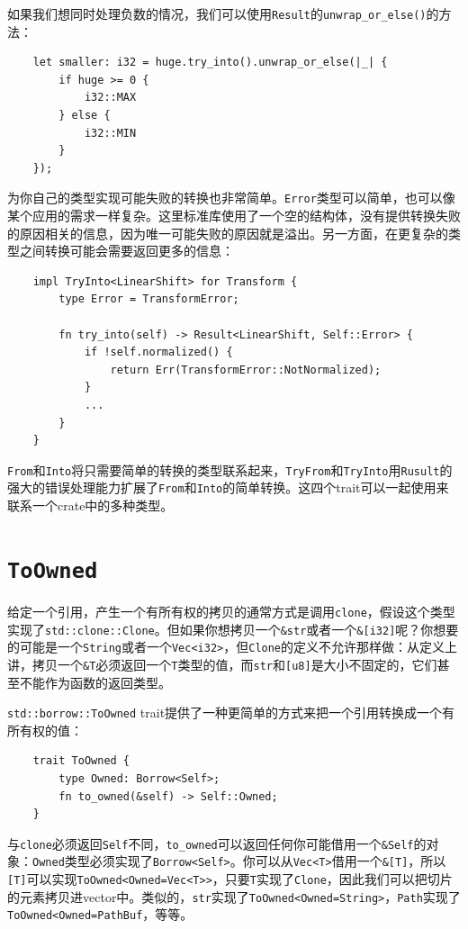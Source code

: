如果我们想同时处理负数的情况，我们可以使用\texttt{Result}的\texttt{unwrap\_or\_else()}的方法：
\begin{verbatim}
    let smaller: i32 = huge.try_into().unwrap_or_else(|_| {
        if huge >= 0 {
            i32::MAX
        } else {
            i32::MIN
        }
    });
\end{verbatim}

为你自己的类型实现可能失败的转换也非常简单。\texttt{Error}类型可以简单，也可以像某个应用的需求一样复杂。这里标准库使用了一个空的结构体，没有提供转换失败的原因相关的信息，因为唯一可能失败的原因就是溢出。另一方面，在更复杂的类型之间转换可能会需要返回更多的信息：
\begin{verbatim}
    impl TryInto<LinearShift> for Transform {
        type Error = TransformError;

        fn try_into(self) -> Result<LinearShift, Self::Error> {
            if !self.normalized() {
                return Err(TransformError::NotNormalized);
            }
            ...
        }
    }
\end{verbatim}

\texttt{From}和\texttt{Into}将只需要简单的转换的类型联系起来，\texttt{TryFrom}和\texttt{TryInto}用\texttt{Rusult}的强大的错误处理能力扩展了\texttt{From}和\texttt{Into}的简单转换。这四个trait可以一起使用来联系一个crate中的多种类型。

\section{\texttt{ToOwned}}\label{toowned}

给定一个引用，产生一个有所有权的拷贝的通常方式是调用\texttt{clone}，假设这个类型实现了\texttt{std::clone::Clone}。但如果你想拷贝一个\texttt{\&str}或者一个\texttt{\&[i32]}呢？你想要的可能是一个\texttt{String}或者一个\texttt{Vec<i32>}，但\texttt{Clone}的定义不允许那样做：从定义上讲，拷贝一个\texttt{\&T}必须返回一个\texttt{T}类型的值，而\texttt{str}和\texttt{[u8]}是大小不固定的，它们甚至不能作为函数的返回类型。

\texttt{std::borrow::ToOwned} trait提供了一种更简单的方式来把一个引用转换成一个有所有权的值：
\begin{verbatim}
    trait ToOwned {
        type Owned: Borrow<Self>;
        fn to_owned(&self) -> Self::Owned;
    }
\end{verbatim}

与\texttt{clone}必须返回\texttt{Self}不同，\texttt{to\_owned}可以返回任何你可能借用一个\texttt{\&Self}的对象：\texttt{Owned}类型必须实现了\texttt{Borrow<Self>}。你可以从\texttt{Vec<T>}借用一个\texttt{\&[T]}，所以\texttt{[T]}可以实现\texttt{ToOwned<Owned=Vec<T>>}，只要\texttt{T}实现了\texttt{Clone}，因此我们可以把切片的元素拷贝进vector中。类似的，\texttt{str}实现了\texttt{ToOwned<Owned=String>}，\texttt{Path}实现了\texttt{ToOwned<Owned=PathBuf}，等等。

